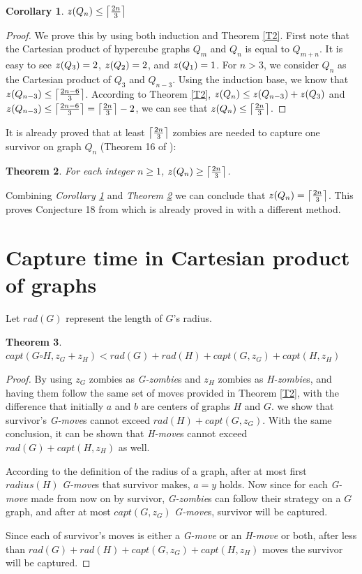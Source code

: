 \documentclass[1p]{elsarticle}
\DeclarePairedDelimiter\ceil{\lceil}{\rceil} \DeclarePairedDelimiter\floor{\lfloor}{\rfloor}
\newtheorem{theorem}{Theorem}
\newtheorem{corollary}[theorem]{Corollary}
\newcommand{\zn}{\ooalign{$z$\cr\hfil\rule[.5ex]{.2em}{.08ex}\hfil\cr}}
\begin{document}
\begin{corollary}
	\label{C3}
	$\zn(Q_{n}) \leq \ceil*{\frac{2n}{3}}$
\end{corollary}
\begin{proof}
	We prove this by using both induction and Theorem \ref{T2}. First note that the Cartesian product of
	hypercube graphs $Q_{m}$ and $Q_{n}$ is equal to $Q_{m+n}$. It is easy to see $\zn(Q_3) = 2$, $\zn(Q_2) = 2$, and
	$\zn(Q_1) = 1$. For $n > 3$, we consider $Q_n$ as the Cartesian product of $Q_3$ and $Q_{n-3}$. Using the induction
	base, we know that $\zn(Q_{n-3}) \leq \ceil*{\frac{2n - 6}{3}}$. According to Theorem \ref{T2}, $\zn(Q_n) \leq
	\zn(Q_{n-3}) + \zn(Q_3)$ and $\zn(Q_{n-3}) \leq \ceil*{\frac{2n - 6}{3}} = \ceil*{\frac{2n}{3}} - 2$, we can see that
	$\zn(Q_n) \leq \ceil*{\frac{2n}{3}}$.
\end{proof}

It is already proved that at least $\ceil*{\frac{2n}{3}}$ zombies are needed to capture one survivor on graph $Q_n$
(Theorem 16 of \cite{Fitz16}):

\begin{theorem}
	\label{T4}
	For each integer $n \geq 1$, $\zn(Q_n) \geq \ceil*{\frac{2n}{3}} $.
\end{theorem}

Combining {\it Corollary \ref{C3}} and {\it Theorem \ref{T4}} we can conclude that $\zn(Q_n) = \ceil*{\frac{2n}{3}}$.
This proves Conjecture 18 from \cite{Fitz16} which is already proved in \cite{Offner19} with a different method. 
	

\section{Capture time in Cartesian product of graphs}\label{capturetime}
	
	Let $rad(G)$ represent the length of $G$'s radius.
	\begin{theorem}
		\label{T5}
		$capt( G \square H, z_G + z_H ) < rad(G) + rad(H) + capt(G, z_G) + capt(H, z_H)$
	\end{theorem}
	\begin{proof}
		By using $z_G$ zombies as {\it G-zombie}s and $z_H$ zombies as {\it H-zombie}s, and having them follow the same
		set of moves provided in Theorem \ref{T2}, with the difference that initially $a$ and $b$ are centers of graphs
		$H$ and $G$. we show that survivor's {\it G-move}s cannot exceed $rad(H) + capt(G, z_G)$. With the same
		conclusion, it can be shown that {\it H-move}s cannot exceed $rad(G) + capt(H, z_H)$ as well.

		According to the definition of the radius of a graph, after at most first $radius(H)$ {\it G-move}s that
		survivor makes, $a = y$ holds. Now since for each {\it G-move} made from now on by survivor, {\it G-zombie}s can
		follow their strategy on a $G$ graph, and after at most $capt(G,z_G)$ {\it G-move}s, survivor will be captured. 
		
		Since each of survivor's moves is either a {\it G-move} or an {\it H-move} or both, after less than $rad(G) +
		rad(H) + capt(G, z_G) + capt(H, z_H)$ moves the survivor will be captured.
	\end{proof}
\end{document}
